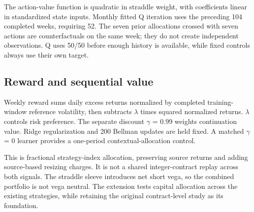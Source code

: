 The action-value function is quadratic in straddle weight, with coefficients linear in standardized state inputs. Monthly fitted Q iteration uses the preceding 104 completed weeks, requiring 52. The seven prior allocations crossed with seven actions are counterfactuals on the same week; they do not create independent observations. Q uses 50/50 before enough history is available, while fixed controls always use their own target.

\subsection*{Reward and sequential value}
Weekly reward sums daily excess returns normalized by completed training-window reference volatility, then subtracts $\lambda$ times squared normalized returns. $\lambda$ controls risk preference. The separate discount $\gamma$ = 0.99 weights continuation value. Ridge regularization and 200 Bellman updates are held fixed. A matched $\gamma$ = 0 learner provides a one-period contextual-allocation control.

This is fractional strategy-index allocation, preserving source returns and adding source-based resizing charges. It is not a shared integer-contract replay across both signals. The straddle sleeve introduces net short vega, so the combined portfolio is not vega neutral. The extension tests capital allocation across the existing strategies, while retaining the original contract-level study as its foundation.

\clearpage
